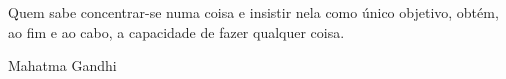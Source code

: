 \newpage
\null\vfill
\begin{flushright}
\begin{minipage}{9.0cm}
Quem sabe concentrar-se numa coisa e insistir nela como único objetivo, obtém, ao fim e ao cabo, a capacidade de fazer qualquer coisa.
\end{minipage}
\end{flushright}


\begin{flushright}
 Mahatma Gandhi
\end{flushright}

\null

